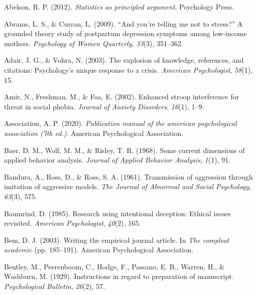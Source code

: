 \documentclass[
]{krantz}
\newlength{\cslhangindent}
\newlength{\cslentryspacingunit} %
\newenvironment{CSLReferences}[2] %
 {%
  \setlength{\parindent}{0pt}
  \ifodd #1
  \let\oldpar\par
  \def\par{\hangindent=\cslhangindent\oldpar}
  \fi
  \setlength{\parskip}{#2\cslentryspacingunit}
 }%
 {}
\begin{document}
\hypertarget{refs}{}
\begin{CSLReferences}{1}{0}
\leavevmode{}%
Abelson, R. P. (2012). \emph{Statistics as principled argument}. Psychology Press.

\leavevmode{}%
Abrams, L. S., \& Curran, L. (2009). {``And you're telling me not to stress?''} A grounded theory study of postpartum depression symptoms among low-income mothers. \emph{Psychology of Women Quarterly}, \emph{33}(3), 351--362.

\leavevmode{}%
Adair, J. G., \& Vohra, N. (2003). The explosion of knowledge, references, and citations: Psychology's unique response to a crisis. \emph{American Psychologist}, \emph{58}(1), 15.

\leavevmode{}%
Amir, N., Freshman, M., \& Foa, E. (2002). Enhanced stroop interference for threat in social phobia. \emph{Journal of Anxiety Disorders}, \emph{16}(1), 1--9.

\leavevmode{}%
Association, A. P. (2020). \emph{Publication manual of the american psychological association (7th ed.)}. American Psychological Association.

\leavevmode{}%
Baer, D. M., Wolf, M. M., \& Risley, T. R. (1968). Some current dimensions of applied behavior analysis. \emph{Journal of Applied Behavior Analysis}, \emph{1}(1), 91.

\leavevmode{}%
Bandura, A., Ross, D., \& Ross, S. A. (1961). Transmission of aggression through imitation of aggressive models. \emph{The Journal of Abnormal and Social Psychology}, \emph{63}(3), 575.

\leavevmode{}%
Baumrind, D. (1985). Research using intentional deception: Ethical issues revisited. \emph{American Psychologist}, \emph{40}(2), 165.

\leavevmode{}%
Bem, D. J. (2003). Writing the empirical journal article. In \emph{The compleat academic} (pp. 185--191). American Psychological Association.

\leavevmode{}%
Bentley, M., Peerenboom, C., Hodge, F., Passano, E. B., Warren, H., \& Washburn, M. (1929). Instructions in regard to preparation of manuscript. \emph{Psychological Bulletin}, \emph{26}(2), 57.


\end{CSLReferences}
\end{document}
